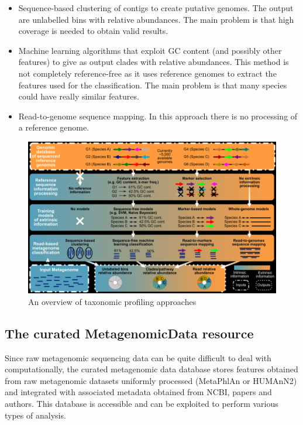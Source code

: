     \begin{multicols}{2}
        \begin{itemize}
            \item Sequence-based clustering of contigs to create putative genomes.
                The output are unlabelled bins with relative abundances.
                The main problem is that high coverage is needed to obtain valid results.
            \item Machine learning algorithms that exploit GC content (and possibly other features) to give as output clades with relative abundances.
                This method is not completely reference-free as it uses reference genomes to extract the features used for the classification.
                The main problem is that many species could have really similar features.
            \item Read-to-genome sequence mapping.
                In this approach there is no processing of a reference genome.
        \end{itemize}
    \end{multicols}

    \begin{figure}[H]
        \centering
        \includegraphics[scale=0.3]{taxApproaches.png}
        \caption{\label{fig:taxApproaches}An overview of taxonomic profiling approaches}
    \end{figure}

    \subsection{The curated MetagenomicData resource}
    Since raw metagenomic sequencing data can be quite difficult to deal with computationally, the curated metagenomic data database stores features obtained from raw metagenomic datasets uniformly processed (MetaPhlAn or HUMAnN2) and integrated with associated metadata obtained from NCBI, papers and authors.
    This database is accessible and can be exploited to perform various types of analysis.


